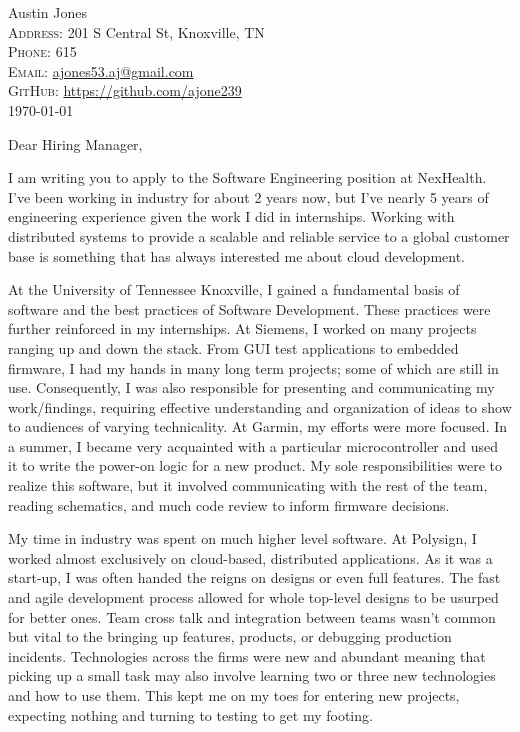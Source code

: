 \documentclass[a4paper,12pt]{article}
\begin{document}
\pagestyle{empty} %


\Huge Austin Jones\smallskip{} \\
\small \textsc{Address:} 201 S Central St, Knoxville, TN \\
\small \textsc{Phone:} 615 \\
\textsc{Email:} \href{mailto:ajones53.aj@gmail.com}{ajones53.aj@gmail.com} \\
\textsc{GitHub:} \href{https://github.com/ajone239}{https://github.com/ajone239} \\

\today

Dear Hiring Manager,

I am writing you to apply to the Software Engineering position at NexHealth.
I've been working in industry for about 2 years now, but I've nearly 5 years of engineering experience given the work I did in internships.
Working with distributed systems to provide a scalable and reliable service to a global customer base is something that has always interested me about cloud development.


At the University of Tennessee Knoxville, I gained a fundamental basis of software and the best practices of Software Development.
These practices were further reinforced in my internships.
At Siemens, I worked on many projects ranging up and down the stack.
From GUI test applications to embedded firmware, I had my hands in many long term projects; some of which are still in use.
Consequently, I was also responsible for presenting and communicating my work/findings, requiring effective understanding and organization of ideas to show to audiences of varying technicality.
At Garmin, my efforts were more focused.
In a summer, I became very acquainted with a particular microcontroller and used it to write the power-on logic for a new product.
My sole responsibilities were to realize this software, but it involved communicating with the rest of the team, reading schematics, and much code review to inform firmware decisions.

My time in industry was spent on much higher level software.
At Polysign, I worked almost exclusively on cloud-based, distributed applications.
As it was a start-up, I was often handed the reigns on designs or even full features.
The fast and agile development process allowed for whole top-level designs to be usurped for better ones.
Team cross talk and integration between teams wasn't common but vital to the bringing up features, products, or debugging production incidents.
Technologies across the firms were new and abundant meaning that picking up a small task may also involve learning two or three new technologies and how to use them.
This kept me on my toes for entering new projects, expecting nothing and turning to testing to get my footing.
\end{document}
